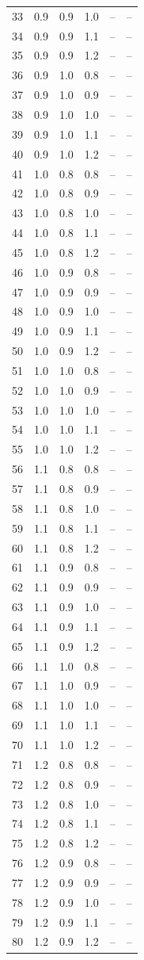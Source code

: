 \begin{longtable}{cccccc}
33&0.9&0.9&1.0&--&--\\
34&0.9&0.9&1.1&--&--\\
35&0.9&0.9&1.2&--&--\\
36&0.9&1.0&0.8&--&--\\
37&0.9&1.0&0.9&--&--\\
38&0.9&1.0&1.0&--&--\\
39&0.9&1.0&1.1&--&--\\
40&0.9&1.0&1.2&--&--\\
41&1.0&0.8&0.8&--&--\\
42&1.0&0.8&0.9&--&--\\
43&1.0&0.8&1.0&--&--\\
44&1.0&0.8&1.1&--&--\\
45&1.0&0.8&1.2&--&--\\
46&1.0&0.9&0.8&--&--\\
47&1.0&0.9&0.9&--&--\\
48&1.0&0.9&1.0&--&--\\
49&1.0&0.9&1.1&--&--\\
50&1.0&0.9&1.2&--&--\\
51&1.0&1.0&0.8&--&--\\
52&1.0&1.0&0.9&--&--\\
53&1.0&1.0&1.0&--&--\\
54&1.0&1.0&1.1&--&--\\
55&1.0&1.0&1.2&--&--\\
56&1.1&0.8&0.8&--&--\\
57&1.1&0.8&0.9&--&--\\
58&1.1&0.8&1.0&--&--\\
59&1.1&0.8&1.1&--&--\\
60&1.1&0.8&1.2&--&--\\
61&1.1&0.9&0.8&--&--\\
62&1.1&0.9&0.9&--&--\\
63&1.1&0.9&1.0&--&--\\
64&1.1&0.9&1.1&--&--\\
65&1.1&0.9&1.2&--&--\\
66&1.1&1.0&0.8&--&--\\
67&1.1&1.0&0.9&--&--\\
68&1.1&1.0&1.0&--&--\\
69&1.1&1.0&1.1&--&--\\
70&1.1&1.0&1.2&--&--\\
71&1.2&0.8&0.8&--&--\\
72&1.2&0.8&0.9&--&--\\
73&1.2&0.8&1.0&--&--\\
74&1.2&0.8&1.1&--&--\\
75&1.2&0.8&1.2&--&--\\
76&1.2&0.9&0.8&--&--\\
77&1.2&0.9&0.9&--&--\\
78&1.2&0.9&1.0&--&--\\
79&1.2&0.9&1.1&--&--\\
80&1.2&0.9&1.2&--&--\\
\bottomrule
\end{longtable}
\normalsize
